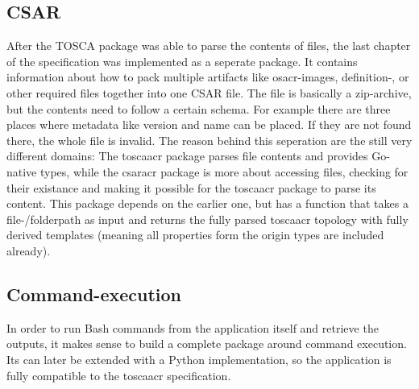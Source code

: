 

\subsection{CSAR}
After the TOSCA package was able to parse the contents of files, the last chapter of the specification was implemented as a seperate package. It contains information about how to pack multiple artifacts like \gls{osacr}-images, definition-, or other required files together into one CSAR file. The file is basically a zip-archive, but the contents need to follow a certain schema. For example there are three places where metadata like version and name can be placed. If they are not found there, the whole file is invalid.
\newline
The reason behind this seperation are the still very different domains: The \gls{toscaacr} package parses file contents and provides Go-native types, while the \gls{csaracr} package is more about accessing files, checking for their existance and making it possible for the \gls{toscaacr} package to parse its content.
\newline
This package depends on the earlier one, but has a function that takes a file-/folderpath as input and returns the fully parsed \gls{toscaacr} topology with fully derived templates (meaning all properties form the origin types are included already).


\subsection{Command-execution}
In order to run Bash commands from the application itself and retrieve the outputs, it makes sense to build a complete package around command execution. Its can later be extended with a Python implementation, so the application is fully compatible to the \gls{toscaacr} specification.

